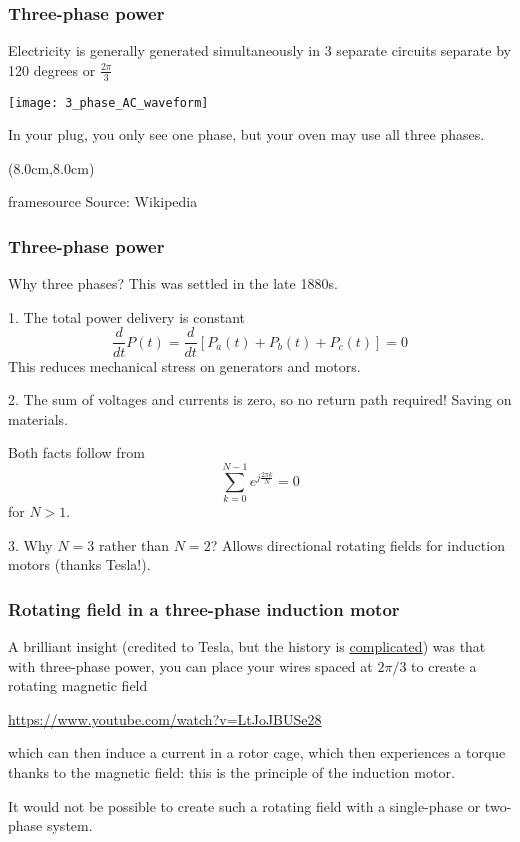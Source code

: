\documentclass[10pt,dvipsnames]{beamer}
\newcommand{\source}[1]{\begin{textblock*}{4cm}(8.0cm,8.0cm)
    \begin{beamercolorbox}[ht=0.5cm,right]{framesource}
        \usebeamerfont{framesource}\usebeamercolor[fg]{framesource} Source: {#1}
    \end{beamercolorbox}
\end{textblock*}}
\begin{document}
\begin{frame}
  \frametitle{Three-phase power}

  Electricity is generally generated simultaneously in
    3 separate circuits separate by 120 degrees or $\frac{2\pi}{3}$
  \begin{center}
  \texttt{[image: 3\_phase\_AC\_waveform]}
  \end{center}

  In your plug, you only see one phase, but your oven may use all
  three phases.

  \source{Wikipedia}
\end{frame}


\begin{frame}
  \frametitle{Three-phase power}

  Why three phases? This was settled in the late 1880s.


  1. The total power delivery is constant
  \begin{equation*}
    \frac{d}{dt} P(t) =     \frac{d}{dt} \left[P_a(t) + P_b(t) + P_c(t) \right] = 0
  \end{equation*}
  This reduces mechanical stress on generators and motors.

  2. The sum of voltages and currents is zero, so no return path
  required! Saving on materials.

  Both facts follow from
  \begin{equation*}
    \sum_{k=0}^{N-1} e^{j\frac{2\pi k}{N}} = 0
  \end{equation*}
  for $N > 1$.

  3. Why $N=3$ rather than $N=2$? Allows directional rotating fields for induction motors (thanks Tesla!).
\end{frame}




\begin{frame}
  \frametitle{Rotating field in a three-phase induction motor}

  A brilliant insight (credited to Tesla, but the history is
  \href{https://en.wikipedia.org/wiki/Induction\_motor\#History}{complicated})
  was that with three-phase power, you can place your wires spaced at
  $2\pi/3$ to create a \alert{rotating} magnetic field

  \url{https://www.youtube.com/watch?v=LtJoJBUSe28}

  which can then induce a current in a rotor cage, which then
  experiences a torque thanks to the magnetic field: this is the
  principle of the \alert{induction motor}.

  It would not be possible to create such a rotating field with a
  single-phase or two-phase system.

\end{frame}
\end{document}
